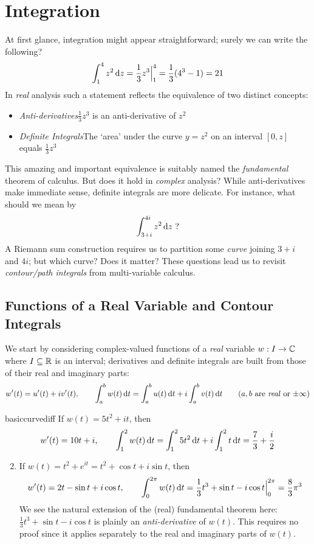 \graphicspath{{4integrals/asy/}}


\section{Integration}

At first glance, integration might appear straightforward; surely we can write the following?
\[
	\int_1^4 z^2\,{\mathrm{d} z}=\frac 13z^3\Big|_1^4 =\frac 13(4^3-1) =21
\]
In \emph{real} analysis such a statement reflects the equivalence of two distinct concepts:
\begin{itemize}\itemsep0pt
	\item[]\emph{Anti-derivatives}\quad $\frac 13z^3$ is an anti-derivative of $z^2$
	\item[]\emph{Definite Integrals}\quad The `area' under the curve $y=z^2$ on an interval $[0,z]$ equals $\frac 13z^3$
\end{itemize}
This amazing and important equivalence is suitably named the \emph{fundamental} theorem of calculus. But does it hold in \emph{complex} analysis? While anti-derivatives make immediate sense, definite integrals are more delicate. For instance, what should we mean by
\[
	\int_{3+i}^{4i} z^2\,{\mathrm{d} z}\text{ ?}
\]
A Riemann sum construction requires us to partition some \emph{curve} joining $3+i$ and $4i$; but which curve? Does it matter? These questions lead us to revisit \emph{contour/path integrals} from multi-variable calculus.

\subsection[Contour Integrals]{Functions of a Real Variable and Contour Integrals}\label{sec:contour}

We start by considering complex-valued functions of a \emph{real} variable $w:I\to\mathbb{C}$ where $I\subseteq\mathbb{R}$ is an interval; derivatives and definite integrals are built from those of their real and imaginary parts:
\[
	w'(t)=u'(t)+iv'(t),\qquad
	\int_a^bw(t)\,\dt=\int_a^bu(t)\,\dt+i\int_a^bv(t)\,\dt
	\tag{$a,b$ are \emph{real} or $\pm\infty$}
\]

\begin{examples}{}{basiccurvediff}
	\exstart If $w(t)=5t^2+it$, then
	\[
		w'(t)=10t+i,\qquad \int_1^2w(t)\,{\mathrm{d} t}=\int_1^25t^2\,{\mathrm{d} t}+i\int_1^2t\,{\mathrm{d} t} =\frac 73+\frac i2
	\]
	\begin{enumerate}\setcounter{enumi}{1}
		\item If $w(t)=t^2+e^{it}=t^2+\cos t+i\sin t$, then
		\[
			w'(t)=2t-\sin t+i\cos t,\qquad \int_0^{2\pi}w(t)\,{\mathrm{d} t}=\frac 13t^3+\sin t-i\cos t\Big|_0^{2\pi}=\frac 83\pi^3
		\]
		We see the natural extension of the (real) fundamental theorem here: $\frac 13t^3+\sin t-i\cos t$ is plainly an \emph{anti-derivative} of $w(t)$. This requires no proof since it applies separately to the real and imaginary parts of $w(t)$.
	\end{enumerate}
\end{examples}

